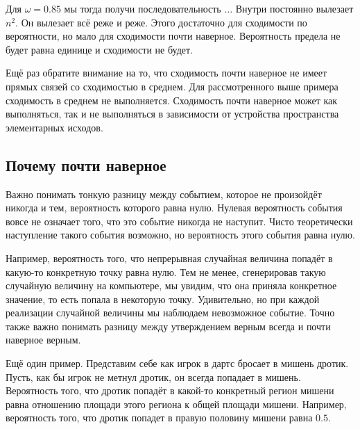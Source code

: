 \documentclass[12pt, a4paper, oneside]{article}
\begin{document}
\begin{center}
\end{center}

Для $\omega = 0.85$ мы тогда получи последовательность $\ldots$ Внутри постоянно вылезает $n^2$. Он вылезает всё реже и реже. Этого достаточно для сходимости по вероятности, но мало для сходимости почти наверное. Вероятность предела не будет равна единице и сходимости не будет. 

Ещё раз обратите внимание на то, что сходимость почти наверное не имеет прямых связей со сходимостью в среднем. Для рассмотренного выше примера сходимость в среднем не выполняется. Сходимость почти наверное может как выполняться, так и не выполняться в зависимости от устройства пространства элементарных исходов.

\subsection{Почему почти наверное} 

Важно понимать тонкую разницу между событием, которое не произойдёт никогда и тем, вероятность которого равна нулю.  Нулевая вероятность события вовсе не означает того, что это событие никогда не наступит. Чисто теоретически наступление такого события возможно, но вероятность этого события равна нулю.

Например, вероятность того, что непрерывная случайная величина попадёт в какую-то конкретную точку равна нулю. Тем не менее, сгенерировав такую случайную величину на компьютере, мы увидим, что она приняла конкретное значение, то есть попала в некоторую точку. Удивительно, но при каждой реализации случайной величины мы наблюдаем невозможное событие. Точно также важно понимать разницу между утверждением верным всегда и почти наверное верным. 

Ещё один пример. Представим себе как игрок в дартс бросает в мишень дротик. Пусть, как бы игрок не метнул дротик, он всегда попадает в мишень. Вероятность того, что дротик попадёт в какой-то конкретный регион мишени равна отношению площади этого региона к общей площади мишени. Например, вероятность того, что дротик попадет в правую половину мишени равна $0.5$. 
\end{document}

